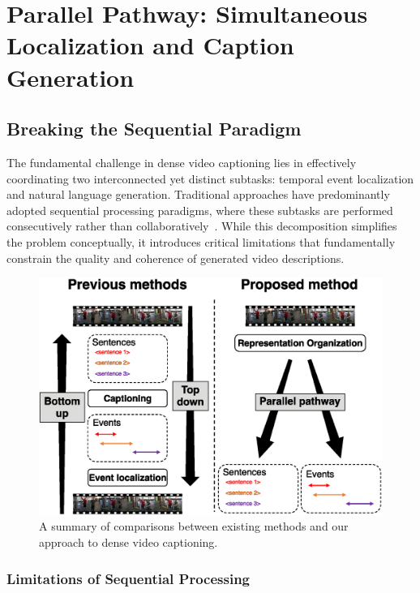 
\chapter{Parallel Pathway: Simultaneous Localization and Caption Generation}
\label{chap:parallel_pathway}


\section{Breaking the Sequential Paradigm}

The fundamental challenge in dense video captioning lies in effectively coordinating two interconnected yet distinct subtasks: temporal event localization and natural language generation.
Traditional approaches have predominantly adopted sequential processing paradigms, where these subtasks are performed consecutively rather than collaboratively~\cite{krishna2017dense,li2018jointly,wang2018bidirectional,mun2019streamlined}.
While this decomposition simplifies the problem conceptually, it introduces critical limitations that fundamentally constrain the quality and coherence of generated video descriptions.

\begin{figure}[t]
  \centering
  \includegraphics[width=\linewidth]{figures/ppvc_fig1}
  \caption{A summary of comparisons between existing methods and our approach to dense video captioning.}
  \label{fig:intro_approaches}
\end{figure}

\subsection{Limitations of Sequential Processing}

